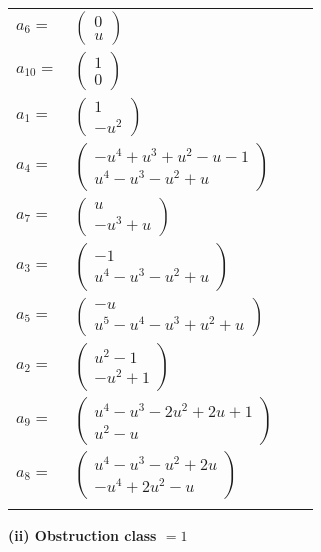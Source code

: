 \documentclass[1p]{elsarticle_modified}
\theoremstyle{definition}
\begin{document}
\begin{tabular}{m{7pt} m{180pt} m{7pt} m{180pt} }
\flushright $a_{6}=$&$\begin{pmatrix}0\\u\end{pmatrix}$ \\
\flushright $a_{10}=$&$\begin{pmatrix}1\\0\end{pmatrix}$ \\
\flushright $a_{1}=$&$\begin{pmatrix}1\\- u^2\end{pmatrix}$ \\
\flushright $a_{4}=$&$\begin{pmatrix}- u^4+u^3+u^2- u-1\\u^4- u^3- u^2+u\end{pmatrix}$ \\
\flushright $a_{7}=$&$\begin{pmatrix}u\\- u^3+u\end{pmatrix}$ \\
\flushright $a_{3}=$&$\begin{pmatrix}-1\\u^4- u^3- u^2+u\end{pmatrix}$ \\
\flushright $a_{5}=$&$\begin{pmatrix}- u\\u^5- u^4- u^3+u^2+u\end{pmatrix}$ \\
\flushright $a_{2}=$&$\begin{pmatrix}u^2-1\\- u^2+1\end{pmatrix}$ \\
\flushright $a_{9}=$&$\begin{pmatrix}u^4- u^3-2 u^2+2 u+1\\u^2- u\end{pmatrix}$ \\
\flushright $a_{8}=$&$\begin{pmatrix}u^4- u^3- u^2+2 u\\- u^4+2 u^2- u\end{pmatrix}$\\&\end{tabular}
\flushleft \textbf{(ii) Obstruction class $= 1$}\\~\\
\end{document}
